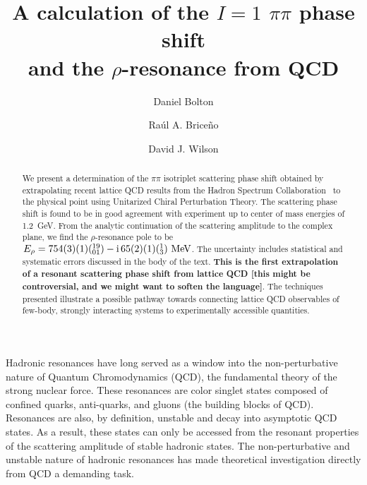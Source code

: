\documentclass[twocolumn,hyperpdf,
amsmath,amssymb,
aps,prd,10pt,
superscriptaddress,nofootinbib,noeprint,preprintnumbers]{revtex4-1}
\newcommand{\Erho}{\rm 754(3)(1)(^{19}_{01})-i\,65(2)(1)(^{1}_{3})~MeV}
\newcommand{\raul}{\bf \color{blue}}
\begin{document}

\pacs{}

 
\title{A calculation of the $I=1$ $\pi\pi$ phase shift \\
and the $\rho$-resonance from QCD}


\author{Daniel Bolton}
\author{Ra\'ul A. Brice\~no}
\author{David J. Wilson}



\begin{abstract}
 We present a determination of the $\pi\pi$ isotriplet scattering phase shift obtained by extrapolating recent lattice QCD results from the Hadron Spectrum Collaboration~\cite{Wilson:2015dqa} to the physical point using Unitarized Chiral Perturbation Theory. The scattering phase shift is found to be in good agreement with experiment up to center of mass energies of 1.2~GeV. From the analytic continuation of the scattering amplitude to the complex plane, we find the $\rho$-resonance pole to be $E_\rho=\Erho$. The uncertainty includes statistical and systematic errors discussed in the body of the text. {\raul This is the first extrapolation of a resonant scattering phase shift from lattice QCD [this might be controversial, and we might want to soften the language]}. The techniques presented illustrate a possible pathway towards connecting lattice QCD observables of few-body, strongly interacting systems to experimentally accessible quantities. 
 \end{abstract}

\maketitle

 
 
Hadronic resonances have long served as a window into the non-perturbative nature of Quantum Chromodynamics (QCD), the fundamental theory of the strong nuclear force. These resonances are color singlet states composed of confined quarks, anti-quarks, and gluons (the building blocks of QCD). Resonances are also, by definition, unstable and decay into asymptotic QCD states. As a result, these states can only be accessed from the resonant properties of the scattering amplitude of stable hadronic states. The non-perturbative and unstable nature of hadronic resonances has made theoretical investigation directly from QCD a demanding task. 
\end{document}
